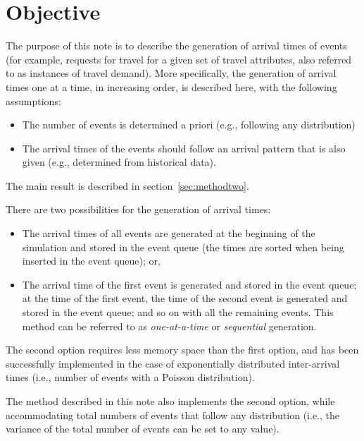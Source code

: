 \documentclass[12pt]{article} %
\begin{document}
\section{Objective}
%
The purpose of this note is to describe the generation of arrival
times of events (for example, requests for travel for a given set of
travel attributes, also referred to as instances of travel
demand). More specifically, the generation of arrival times one at a
time, in increasing order, is described here, with the following
assumptions:
\begin{itemize}
\item The number of events is determined a priori (e.g., following any
  distribution)
\item The arrival times of the events should follow an arrival pattern
  that is also given (e.g., determined from historical data).
\end{itemize}
The main result is described in section~\ref{sec:methodtwo}.\par
There are two possibilities for the generation of arrival times:
\begin{itemize}
\item The arrival times of all events are generated at the beginning
  of the simulation and stored in the event queue (the times are
  sorted when being inserted in the event queue); or,
\item The arrival time of the first event is generated and stored in
  the event queue; at the time of the first event, the time of the
  second event is generated and stored in the event queue; and so on
  with all the remaining events. This method can be referred to as
  {\itshape one-at-a-time} or {\itshape sequential} generation.
\end{itemize}
The second option requires less memory space than the first option,
and has been successfully implemented in the case of exponentially
distributed inter-arrival times (i.e., number of events with a Poisson
distribution).\par
The method described in this note also implements the second option,
while accommodating total numbers of events that follow any
distribution (i.e., the variance of the total number of events can be
set to any value).
%
%
\end{document}
